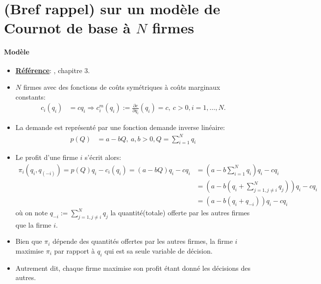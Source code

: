 \documentclass[notes, ignorenonframetext, compress, 10pt, xcolor=svgnames, aspectratio=169]{beamer}
\begin{document}
\section{(Bref rappel) sur un modèle de Cournot de base à $N$ firmes}
\frame{\sectionpage}
\begin{frame}[allowframebreaks]{\insertsection}
\framesubtitle{Modèle}
\begin{itemize}
\item \textbf{\underline{Référence}}: \cite{belleflamme_peitz_2015}, chapitre 3.
\item $N$ firmes avec des fonctions de coûts symétriques à coûts marginaux constants:
\begin{align*}
    c_i(q_i) &=cq_i \Rightarrow c^m_i(q_i):= \frac{\partial c}{\partial q_i}(q_i) = c, \ c > 0, i=1, \ldots, N.
\end{align*}
\item La demande est représenté par une fonction demande inverse linéaire:
\begin{align*}
p(Q) &= a-bQ, \ a, b > 0, Q = \sum_{i=1}^N q_i
\end{align*}
\item Le profit d'une firme $i$ s'écrit alors: 
\begin{align*}
\pi_i(q_i, q_{(-i)}) = p(Q)q_i - c_i(q_i) =  (a-bQ)q_i - cq_i &= (a-b\sum_{i=1}^N q_i)q_i - cq_i\\
& = \left(a-b(q_i + \sum_{j=1, j\neq i}^N q_j)\right)q_i - cq_i\\
&= \left(a-b(q_i + q_{-i})\right)q_i - cq_i
\end{align*}
où on note $q_{-i}:= \sum_{j=1, j\neq i}^N q_j $ la quantité(totale) offerte par les autres firmes que la firme $i$.
\item Bien que $\pi_i$ dépende des quantités offertes par les autres firmes, 
la firme $i$ maximise $\pi_i$ par rapport à $q_i$ qui est sa seule variable de décision.
\item Autrement dit, chaque firme maximise son profit étant donné les décisions des autres.
\end{itemize}
\end{frame}
\end{document}
